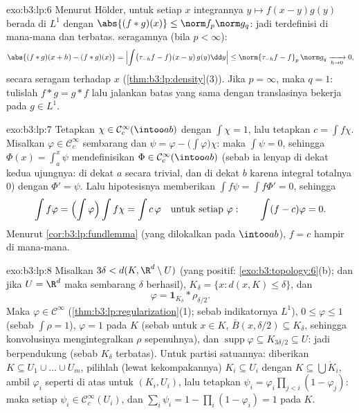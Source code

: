 \begin{solution}{exo:b3:lp:6}
Menurut Hölder, untuk setiap $x$ integrannya $y \mapsto f(x -
y)g(y)$ berada di $L^1$ dengan $\abs{(f*g)(x)} \leq \norm f_p\norm
g_q$: jadi terdefinisi di mana-mana dan terbatas.  seragamnya (bila $p <
\infty$):
\[
\abs{(f*g)(x + h) - (f*g)(x)}
= \Bigl|\int\bigl(\tau_{-h}f - f\bigr)(x - y)\,g(y)\dd y\Bigr|
\leq \norm{\tau_{-h}f - f}_p\,\norm g_q
\xrightarrow[h\to0]{} 0,
\]
secara seragam terhadap $x$ (\cref{thm:b3:lp:density}(3)). Jika $p =
\infty$, maka $q = 1$: tulislah $f * g = g * f$ lalu jalankan batas yang
sama dengan translasinya bekerja pada $g \in L^1$.
\end{solution}

\begin{solution}{exo:b3:lp:7}
Tetapkan $\chi \in \mathcal C_c^\infty(\intoo ab)$ dengan $\int\chi =
1$, lalu tetapkan $c = \int f\chi$. Misalkan $\varphi \in \mathcal
C_c^\infty$ sembarang dan $\psi = \varphi -
\bigl(\int\varphi\bigr)\chi$: maka $\int\psi = 0$, sehingga $\Phi(x)
= \int_a^x\psi$ mendefinisikan $\Phi \in \mathcal C_c^\infty(\intoo
ab)$ (sebab ia lenyap di dekat kedua ujungnya: di dekat $a$ secara trivial, dan di dekat $b$
karena integral totalnya $0$) dengan $\Phi' = \psi$. Lalu
hipotesisnya memberikan $\int f\psi = \int f\Phi' = 0$, sehingga
\[
\int f\varphi = \Bigl(\int\varphi\Bigr)\int f\chi = \int
c\,\varphi
\quad\text{untuk setiap } \varphi:
\qquad \int(f - c)\varphi = 0 .
\]
Menurut \cref{cor:b3:lp:fundlemma} (yang dilokalkan pada $\intoo ab$), $f =
c$ hampir di mana-mana.
\end{solution}

\begin{solution}{exo:b3:lp:8}
Misalkan $3\delta < d(K, \R^d\setminus U)$ (yang positif:
\cref{exo:b3:topology:6}(b); dan jika $U = \R^d$ maka sembarang $\delta$
berhasil), $K_\delta = \{x : d(x, K) \leq \delta\}$, dan
\[
\varphi = \mathbf 1_{K_\delta} * \rho_{\delta/2} .
\]
Maka $\varphi \in \mathcal C^\infty$
(\cref{thm:b3:lp:regularization}(1); sebab indikatornya $L^1$),
$0 \leq \varphi \leq 1$ (sebab $\int\rho = 1$), $\varphi = 1$ pada $K$
(sebab untuk $x \in K$, $\bar B(x, \delta/2) \subseteq K_\delta$, sehingga
konvolusinya mengintegralkan $\rho$ sepenuhnya), dan
$\operatorname{supp}\varphi \subseteq K_{3\delta/2} \subseteq
U$: jadi berpendukung  (sebab $K_\delta$ terbatas). Untuk partisi
satuannya: diberikan $K \subseteq U_1\cup\dots\cup U_m$, pilihlah (lewat
kekompakannya)  $K_i \subseteq U_i$ dengan $K \subseteq
\bigcup \mathring K_i$, ambil $\varphi_i$ seperti di atas untuk $(K_i,
U_i)$, lalu tetapkan $\psi_i = \varphi_i\prod_{j <i}(1 -
\varphi_j)$: maka setiap $\psi_i \in \mathcal C_c^\infty(U_i)$, dan
$\sum_i\psi_i = 1 - \prod_i(1 - \varphi_i) = 1$ pada $K$.
\end{solution}

